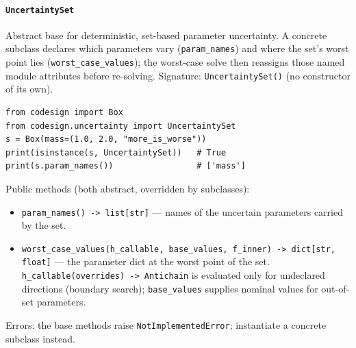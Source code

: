 \documentclass[11pt,a4paper]{article}
\begin{document}
\paragraph{\texttt{UncertaintySet}}\label{ref:uncertainty:uncertaintyset}
Abstract base for deterministic, set-based parameter uncertainty. A concrete
subclass declares which parameters vary (\texttt{param\_names}) and where the
set's worst point lies (\texttt{worst\_case\_values}); the worst-case solve
then reassigns those named module attributes before re-solving.
Signature: \texttt{UncertaintySet()} (no constructor of its own).
\begin{lstlisting}
from codesign import Box
from codesign.uncertainty import UncertaintySet
s = Box(mass=(1.0, 2.0, "more_is_worse"))
print(isinstance(s, UncertaintySet))   # True
print(s.param_names())                 # ['mass']
\end{lstlisting}
Public methods (both abstract, overridden by subclasses):
\begin{itemize}[nosep]
  \item \texttt{param\_names() -> list[str]} --- names of the uncertain
    parameters carried by the set.
  \item \texttt{worst\_case\_values(h\_callable, base\_values, f\_inner) ->
    dict[str, float]} --- the parameter dict at the worst point of the set.
    \texttt{h\_callable(overrides) -> Antichain} is evaluated only for
    undeclared directions (boundary search); \texttt{base\_values} supplies
    nominal values for out-of-set parameters.
\end{itemize}
Errors: the base methods raise \texttt{NotImplementedError}; instantiate a
concrete subclass instead.
\end{document}
